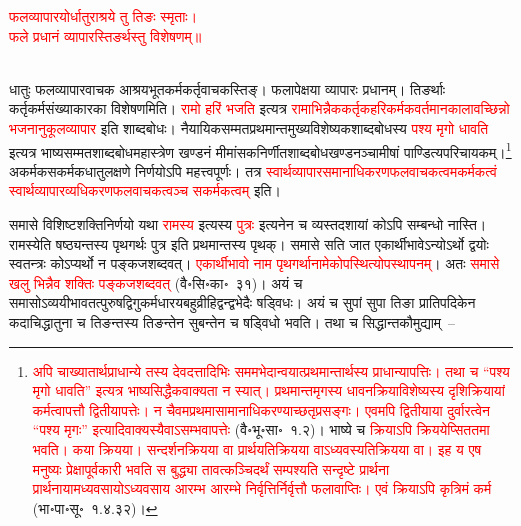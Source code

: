 \centering\textcolor{red}{फलव्यापारयोर्धातुराश्रये तु तिङः स्मृताः।\nopagebreak\\
फले प्रधानं व्यापारस्तिङर्थस्तु विशेषणम्॥}\nopagebreak\\
\\
\begin{sloppypar}\justifying\noindent धातुः फल\-व्यापार\-वाचक आश्रय\-भूत\-कर्म\-कर्तृ\-वाचकस्तिङ्। फलापेक्षया व्यापारः प्रधानम्। तिङर्थाः कर्तृ\-कर्म\-संख्या\-कारका विशेषणमिति। \textcolor{red}{रामो हरिं भजति} इत्यत्र \textcolor{red}{रामाभिन्नैक\-कर्तृक\-हरि\-कर्मक\-वर्तमान\-कालावच्छिन्नो भजनानुकूल\-व्यापार} इति शाब्दबोधः। नैयायिक\-सम्मत\-प्रथमान्त\-मुख्य\-विशेष्यक\-शाब्द\-बोधस्य \textcolor{red}{पश्य मृगो धावति} इत्यत्र भाष्य\-सम्मत\-शाब्दबोध\-महास्त्रेण खण्डनं मीमांसक\-निर्णीत\-शाब्दबोध\-खण्डनञ्चामीषां पाण्डित्य\-परिचायकम्।\footnote{\textcolor{red}{अपि चाख्यातार्थ\-प्राधान्ये तस्य देवदत्तादिभिः सममभेदान्वयात्प्रथमान्तार्थस्य प्राधान्यापत्तिः। तथा च “पश्य मृगो धावति” इत्यत्र भाष्य\-सिद्धैक\-वाक्यता न स्यात्। प्रथमान्त\-मृगस्य धावन\-क्रिया\-विशेष्यस्य दृशिक्रियायां कर्मत्वापत्तौ द्वितीयापत्तेः। न चैवमप्रथमा\-सामानाधि\-करण्याच्छतृप्रसङ्गः। एवमपि द्वितीयाया दुर्वारत्वेन “पश्य मृगः” इत्यादि\-वाक्यस्यैवाऽसम्भवापत्तेः} (वै॰भू॰सा॰~१.२)। भाष्ये च \textcolor{red}{क्रियाऽपि क्रिययेप्सिततमा भवति। कया क्रियया। सन्दर्शनक्रियया वा प्रार्थयतिक्रियया वाऽध्यवस्यतिक्रियया वा। इह य एष मनुष्यः प्रेक्षापूर्वकारी भवति स बुद्ध्या तावत्कञ्चिदर्थं सम्पश्यति सन्दृष्टे प्रार्थना प्रार्थनायामध्यवसायोऽध्यवसाय आरम्भ आरम्भे निर्वृत्तिर्निर्वृत्तौ फलावाप्तिः। एवं क्रियाऽपि कृत्रिमं कर्म} (भा॰पा॰सू॰~१.४.३२)।} अकर्मक\-सकर्मक\-धातु\-लक्षणे निर्णयोऽपि महत्त्वपूर्णः। तत्र \textcolor{red}{स्वार्थ\-व्यापार\-समानाधिकरण\-फल\-वाचकत्वमकर्मकत्वं स्वार्थ\-व्यापार\-व्यधिकरण\-फल\-वाचकत्वञ्च सकर्मकत्वम्} इति।\end{sloppypar}
\begin{sloppypar}\justifying\noindent\hspace{10mm} समासे विशिष्ट\-शक्ति\-निर्णयो यथा \textcolor{red}{रामस्य} इत्यस्य \textcolor{red}{पुत्रः} इत्यनेन च व्यस्त\-दशायां कोऽपि सम्बन्धो नास्ति। रामस्येति षष्ठ्यन्तस्य पृथगर्थः पुत्र इति प्रथमान्तस्य पृथक्। समासे सति जात एकार्थी\-भावेऽन्योऽर्थो द्वयोः स्वतन्त्रः कोऽप्यर्थो न पङ्कज\-शब्दवत्। \textcolor{red}{एकार्थीभावो नाम पृथगर्थानामेकोपस्थित्योप\-स्थापनम्}। अतः \textcolor{red}{समासे खलु भिन्नैव शक्तिः पङ्कज\-शब्दवत्} (वै॰सि॰का॰~३१)। अयं च समासोऽव्ययीभाव\-तत्पुरुष\-द्विगु\-कर्मधारय\-बहुव्रीहि\-द्वन्द्व\-भेदैः षड्विधः। अयं च सुपां सुपा तिङा प्रातिपदिकेन कदाचिद्धातुना च तिङन्तस्य तिङन्तेन सुबन्तेन च षड्विधो भवति। तथा च सिद्धान्तकौमुद्याम्~–\end{sloppypar}
